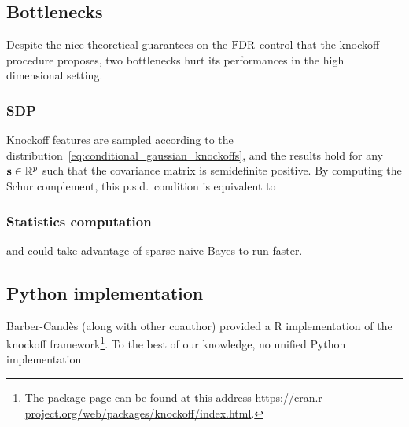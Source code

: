\subsection{Bottlenecks}\label{subsec:kb}

Despite the nice theoretical guarantees on the $\text{FDR}$ control that the knockoff procedure proposes,
two bottlenecks hurt its performances in the high dimensional setting.

\subsubsection{SDP}\label{subsubsec:bot_sdp}

Knockoff features are sampled according to the distribution~\ref{eq:conditional_gaussian_knockoffs},
and the results hold for any $\mathbf{s} \in \mathbb{R}^p$ such that the covariance matrix is semidefinite positive.
By computing the Schur complement, this p.s.d.\ condition is equivalent to

\subsubsection{Statistics computation}\label{subsubsec:bot_stats}

and could take advantage of sparse naive Bayes to run faster.

\subsection{Python implementation}\label{subsec:python_implementation}

Barber-Candès (along with other coauthor) provided a R implementation
of the knockoff framework\footnote{
        The package page can be found at this address \url{https://cran.r-project.org/web/packages/knockoff/index.html}.
}.
To the best of our knowledge, no unified Python implementation 